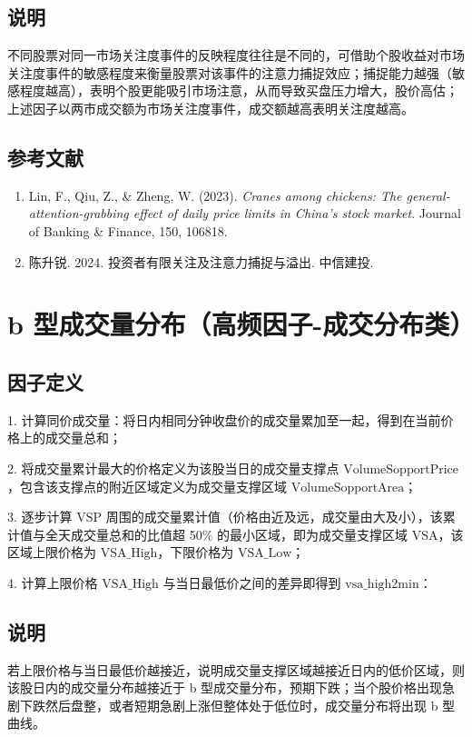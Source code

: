 \documentclass{article}
\begin{document}
\subsection{说明}
不同股票对同一市场关注度事件的反映程度往往是不同的，可借助个股收益对市场关注度事件的敏感程度来衡量股票对该事件的注意力捕捉效应；捕捉能力越强（敏感程度越高），表明个股更能吸引市场注意，从而导致买盘压力增大，股价高估；上述因子以两市成交额为市场关注度事件，成交额越高表明关注度越高。

\subsection{参考文献}
\begin{enumerate}
    \item Lin, F., Qiu, Z., \& Zheng, W. (2023). \textit{Cranes among chickens: The general-attention-grabbing effect of daily price limits in China's stock market}. Journal of Banking \& Finance, 150, 106818.
    \item 陈升锐. 2024. 投资者有限关注及注意力捕捉与溢出. 中信建投.
\end{enumerate}

\section{b 型成交量分布（高频因子-成交分布类）}

\subsection{因子定义}

1. 计算同价成交量：将日内相同分钟收盘价的成交量累加至一起，得到在当前价格上的成交量总和；

2. 将成交量累计最大的价格定义为该股当日的成交量支撑点 \( \mathrm{VolumeSopportPrice} \)，包含该支撑点的附近区域定义为成交量支撑区域 \( \mathrm{VolumeSopportArea} \)；

3. 逐步计算 \( \mathrm{VSP} \) 周围的成交量累计值（价格由近及远，成交量由大及小），该累计值与全天成交量总和的比值超 50\% 的最小区域，即为成交量支撑区域 \( \mathrm{VSA} \)，该区域上限价格为 \( \mathrm{VSA\_High} \)，下限价格为 \( \mathrm{VSA\_Low} \)；

4. 计算上限价格 \( \mathrm{VSA\_High} \) 与当日最低价之间的差异即得到 \( \mathrm{vsa\_high2min} \)：

\subsection{说明}
若上限价格与当日最低价越接近，说明成交量支撑区域越接近日内的低价区域，则该股日内的成交量分布越接近于 b 型成交量分布，预期下跌；当个股价格出现急剧下跌然后盘整，或者短期急剧上涨但整体处于低位时，成交量分布将出现 b 型曲线。
\end{document}
